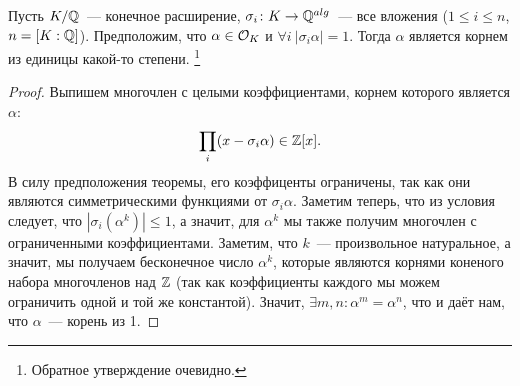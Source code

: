 	\begin{lemma}\label{lemma:14}
		Пусть $K/\mathbb{Q}$~--- конечное расширение, $\sigma_i \colon K \to \mathbb{Q}^{alg}$~--- все вложения ($1 \le i \le n$, $n = [K : \mathbb{Q}]$). Предположим, что $\alpha \in \mathcal{O}_{K}$ и $\forall i \ |\sigma_{i}\alpha| = 1$. Тогда $\alpha$ является корнем из единицы какой-то степени. \footnote{Обратное утверждение очевидно.}
 	\end{lemma}
 	\begin{proof}
 		Выпишем многочлен с целыми коэффициентами, корнем которого является $\alpha$:
 		\[
 			\prod_{i} (x - \sigma_{i} \alpha) \in \mathbb{Z}[x].
 		\]
 		В силу предположения теоремы, его коэффиценты ограничены, так как они являются симметрическими функциями от $\sigma_{i}\alpha$. Заметим теперь, что из условия следует, что $|\sigma_{i}(\alpha^k)| \le 1$, а значит, для $\alpha^k$ мы также получим многочлен с ограниченными коэффициентами. Заметим, что $k$~--- произвольное натуральное, а значит, мы получаем бесконечное число $\alpha^k$, которые являются корнями коненого набора многочленов над $\mathbb{Z}$ (так как коэффициенты  каждого мы можем ограничить одной и той же константой).  Значит, $\exists m, n \colon \alpha^m = \alpha^n$, что и даёт нам, что $\alpha$~--- корень из 1. 
 	\end{proof}

